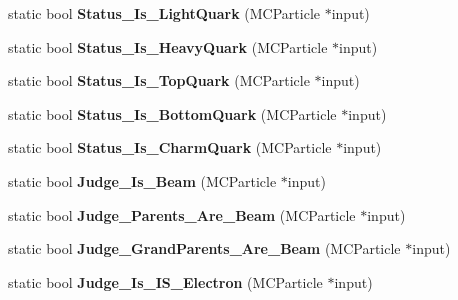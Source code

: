 \begin{DoxyCompactItemize}
\item 
\hypertarget{classToolSet_1_1CMC_ad5954c48a7cf4cb2ed2a139350266c61}{
static bool {\bfseries Status\_\-Is\_\-LightQuark} (MCParticle $\ast$input)}
\label{classToolSet_1_1CMC_ad5954c48a7cf4cb2ed2a139350266c61}

\item 
\hypertarget{classToolSet_1_1CMC_a0e32fa7bb651d3d471da504770ff39d3}{
static bool {\bfseries Status\_\-Is\_\-HeavyQuark} (MCParticle $\ast$input)}
\label{classToolSet_1_1CMC_a0e32fa7bb651d3d471da504770ff39d3}

\item 
\hypertarget{classToolSet_1_1CMC_a0f4beffb9924b6696075b59c1d8770c4}{
static bool {\bfseries Status\_\-Is\_\-TopQuark} (MCParticle $\ast$input)}
\label{classToolSet_1_1CMC_a0f4beffb9924b6696075b59c1d8770c4}

\item 
\hypertarget{classToolSet_1_1CMC_aa67cd425c28243078c8dfac594bdc71f}{
static bool {\bfseries Status\_\-Is\_\-BottomQuark} (MCParticle $\ast$input)}
\label{classToolSet_1_1CMC_aa67cd425c28243078c8dfac594bdc71f}

\item 
\hypertarget{classToolSet_1_1CMC_ab0b28b170ae3a6ee15ffa53138c75f58}{
static bool {\bfseries Status\_\-Is\_\-CharmQuark} (MCParticle $\ast$input)}
\label{classToolSet_1_1CMC_ab0b28b170ae3a6ee15ffa53138c75f58}

\item 
\hypertarget{classToolSet_1_1CMC_aa63f12865d46af350674c7dca3eb5437}{
static bool {\bfseries Judge\_\-Is\_\-Beam} (MCParticle $\ast$input)}
\label{classToolSet_1_1CMC_aa63f12865d46af350674c7dca3eb5437}

\item 
\hypertarget{classToolSet_1_1CMC_a5ccf3aedd3c942ac6644748abaaf70fe}{
static bool {\bfseries Judge\_\-Parents\_\-Are\_\-Beam} (MCParticle $\ast$input)}
\label{classToolSet_1_1CMC_a5ccf3aedd3c942ac6644748abaaf70fe}

\item 
\hypertarget{classToolSet_1_1CMC_ad09856f709fff7320c382efd26a408e9}{
static bool {\bfseries Judge\_\-GrandParents\_\-Are\_\-Beam} (MCParticle $\ast$input)}
\label{classToolSet_1_1CMC_ad09856f709fff7320c382efd26a408e9}

\item 
\hypertarget{classToolSet_1_1CMC_a0630c44bcd0eaf761f4b34e106f2b9d9}{
static bool {\bfseries Judge\_\-Is\_\-IS\_\-Electron} (MCParticle $\ast$input)}
\label{classToolSet_1_1CMC_a0630c44bcd0eaf761f4b34e106f2b9d9}


\end{DoxyCompactItemize}
